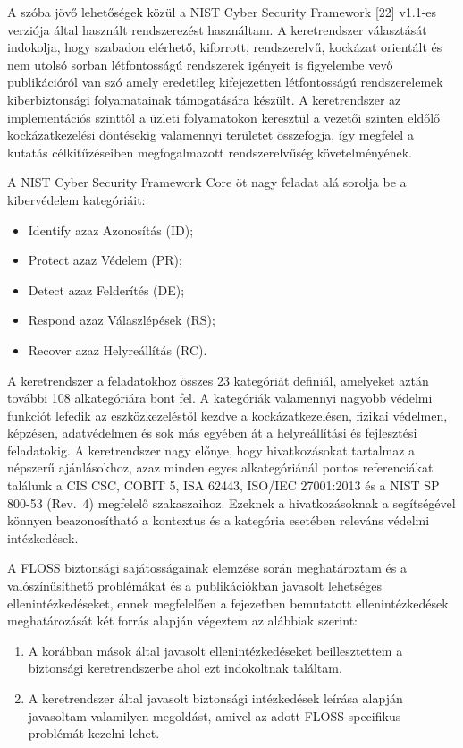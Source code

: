 \documentclass[12pt,magyar,a4paper,oneside]{scrreprt}
\providecommand{\tightlist}{%
  \setlength{\itemsep}{0pt}\setlength{\parskip}{0pt}}
\begin{document}
A szóba jövő lehetőségek közül a NIST Cyber Security Framework {[}22{]}
v1.1-es verziója által használt rendszerezést használtam. A
keretrendszer választását indokolja, hogy szabadon elérhető, kiforrott,
rendszerelvű, kockázat orientált és nem utolsó sorban létfontosságú
rendszerek igényeit is figyelembe vevő publikációról van szó amely
eredetileg kifejezetten létfontosságú rendszerelemek kiberbiztonsági
folyamatainak támogatására készült. A keretrendszer az implementációs
szinttől a üzleti folyamatokon keresztül a vezetői szinten eldőlő
kockázatkezelési döntésekig valamennyi területet összefogja, így
megfelel a kutatás célkitűzéseiben megfogalmazott rendszerelvűség
követelményének.

A NIST Cyber Security Framework Core öt nagy feladat alá sorolja be a
kibervédelem kategóriáit:

\begin{itemize}
\tightlist
\item
  Identify azaz Azonosítás (ID);
\item
  Protect azaz Védelem (PR);
\item
  Detect azaz Felderítés (DE);
\item
  Respond azaz Válaszlépések (RS);
\item
  Recover azaz Helyreállítás (RC).
\end{itemize}

A keretrendszer a feladatokhoz összes 23 kategóriát definiál, amelyeket
aztán további 108 alkategóriára bont fel. A kategóriák valamennyi
nagyobb védelmi funkciót lefedik az eszközkezeléstől kezdve a
kockázatkezelésen, fizikai védelmen, képzésen, adatvédelmen és sok más
egyében át a helyreállítási és fejlesztési feladatokig. A keretrendszer
nagy előnye, hogy hivatkozásokat tartalmaz a népszerű ajánlásokhoz, azaz
minden egyes alkategóriánál pontos referenciákat találunk a CIS CSC,
COBIT 5, ISA 62443, ISO/IEC 27001:2013 és a NIST SP 800-53 (Rev.~4)
megfelelő szakaszaihoz. Ezeknek a hivatkozásoknak a segítségével könnyen
beazonosítható a kontextus és a kategória esetében releváns védelmi
intézkedések.

A FLOSS biztonsági sajátosságainak elemzése során meghatároztam és a
valószínűsíthető problémákat és a publikációkban javasolt lehetséges
ellenintézkedéseket, ennek megfelelően a fejezetben bemutatott
ellenintézkedések meghatározását két forrás alapján végeztem az alábbiak
szerint:

\begin{enumerate}
\def\labelenumi{\arabic{enumi}.}
\tightlist
\item
  A korábban mások által javasolt ellenintézkedéseket beillesztettem a
  biztonsági keretrendszerbe ahol ezt indokoltnak találtam.
\item
  A keretrendszer által javasolt biztonsági intézkedések leírása alapján
  javasoltam valamilyen megoldást, amivel az adott FLOSS specifikus
  problémát kezelni lehet.
\end{enumerate}
\end{document}

